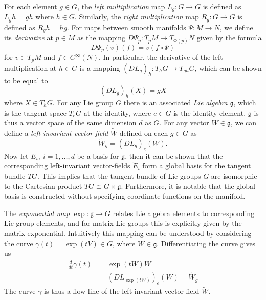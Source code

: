 For each element $g \in G$, the \textit{left multiplication} map $L_g : G \to G$ is defined as $L_g h = gh$ where $h \in G$. Similarly, the \textit{right multiplication} map $R_g : G \to G$ is defined as $R_g h = hg$. For maps between smooth manifolds $\Psi : M \to N$, we define its \textit{derivative} at $p \in M$ as the mapping $D\Psi_p : T_p M \to T_{\Phi(p)} N$ given by the formula
\begin{equation} \label{eq:derivative of linear map}
D\Psi_p (v)(f) = v(f \circ \Psi)
\end{equation}
for $v \in T_p M$ and $f \in C^\infty(N)$. In particular, the derivative of the left multiplication at $h\in G$ is a mapping $(DL_g)_h : T_hG \to T_{gh} G$, which can be shown to be equal to
\begin{equation}
(DL_g)_h(X) = gX
\end{equation}
where $X \in T_h G$. For any Lie group $G$ there is an associated \textit{Lie algebra} $\mathfrak{g}$, which is the tangent space $T_e G$ at the identity, where $e \in G$ is the identity element. $\mathfrak{g}$ is thus a vector space of the same dimension $d$ as $G$. For any vector $W \in \mathfrak{g}$, we can define a \textit{left-invariant vector field} $\tilde{W}$ defined on each $g \in G$ as
\begin{equation} \label{eq:left-invariant vector field}
\tilde{W}_g = (DL_g)_e (W).
\end{equation}
Now let $E_i,\ i=1,\dots,d$ be a basis for $\mathfrak{g}$, then it can be shown that the corresponding left-invariant vector-fields $\tilde{E}_i$ form a global basis for the tangent bundle $TG$. This implies that the tangent bundle of Lie groups $G$ are isomorphic to the Cartesian product $TG \cong G \times \mathfrak{g}$. Furthermore, it is notable that the global basis is constructed without specifying coordinate functions on the manifold.

The \textit{exponential map} $\exp : \mathfrak{g} \to G$ relates Lie algebra elements to corresponding Lie group elements, and for matrix Lie groups this is explicitly given by the matrix exponential. Intuitively this mapping can be understood by considering the curve $\gamma(t) = \exp ( t V ) \in G$, where $W \in \mathfrak{g}$. Differentiating the curve gives us
\begin{equation}
\begin{aligned}
\frac{d}{dt} \gamma(t) & = \exp (t W) W \\
& = (D L_{ \exp (t W) } )_e (W) = \tilde{W}_g
\end{aligned}
\end{equation}
The curve $\gamma$ is thus a flow-line of the left-invariant vector field $\tilde{W}$.

